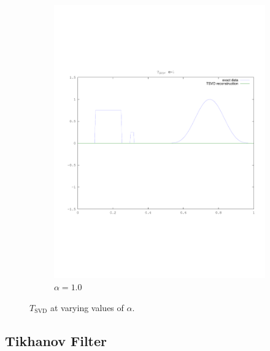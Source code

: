 \documentclass{article}
\begin{document}
\begin{figure}[!htb]
\begin{subfigure}[bh]{0.45\textwidth}
                \includegraphics[width=\textwidth]{plots/tsvd1.pdf}
                \caption{$\alpha=1.0$}
        \end{subfigure}
        \caption{$T_{\text{SVD}}$ at varying values of $\alpha$.}
\end{figure}

\subsection{Tikhanov Filter}
\end{document}
